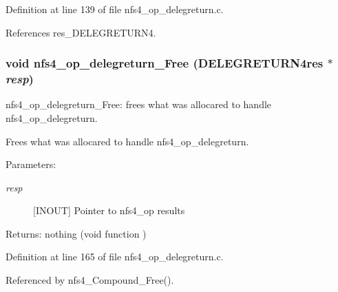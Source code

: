 Definition at line 139 of file nfs4\_\-op\_\-delegreturn.c.

References res\_\-DELEGRETURN4.
\subsubsection{\setlength{\rightskip}{0pt plus 5cm}void nfs4\_\-op\_\-delegreturn\_\-Free (DELEGRETURN4res $\ast$ {\em resp})}\label{nfs4__op__delegreturn_8c_a3}


nfs4\_\-op\_\-delegreturn\_\-Free: frees what was allocared to handle nfs4\_\-op\_\-delegreturn.

Frees what was allocared to handle nfs4\_\-op\_\-delegreturn.

\begin{Desc}
\item[Parameters:]
\begin{description}
\item[{\em resp}][INOUT] Pointer to nfs4\_\-op results\end{description}
\end{Desc}
\begin{Desc}
\item[Returns:]nothing (void function ) \end{Desc}


Definition at line 165 of file nfs4\_\-op\_\-delegreturn.c.

Referenced by nfs4\_\-Compound\_\-Free().